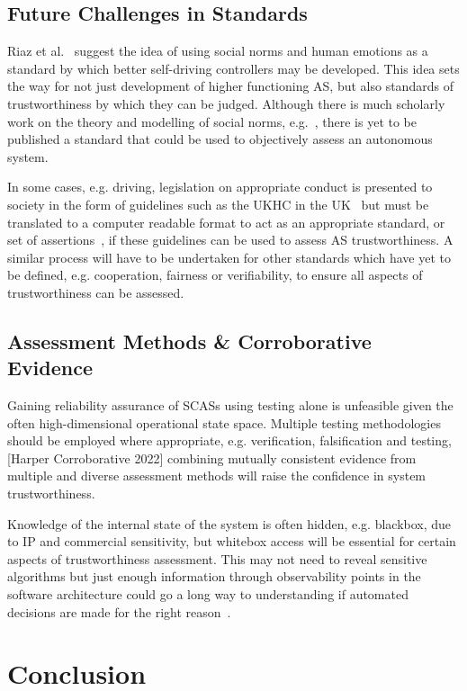 \subsection{Future Challenges in Standards} \label{sec:AssFramVis-fut}

Riaz et al.~\cite{Riaz2018} suggest the idea of using social norms and human emotions as a standard by which better self-driving controllers may be developed. This idea sets the way for not just development of higher functioning AS, but also standards of trustworthiness by which they can be judged. Although there is much scholarly work on the theory and modelling of social norms, e.g.~\cite{hechter2001social}, there is yet to be published a standard that could be used to objectively assess an autonomous system. 

In some cases, e.g. driving, legislation on appropriate conduct is presented to society in the form of guidelines such as the UKHC in the UK~\cite{highwayCode} but must be translated to a computer readable format to act as an appropriate standard, or set of assertions~\cite{harper2021safety}, if these guidelines can be used to assess AS trustworthiness. A similar process will have to be undertaken for other standards which have yet to be defined, e.g. cooperation, fairness or verifiability, to ensure all aspects of trustworthiness can be assessed. 



\subsection{Assessment Methods \& Corroborative Evidence} \label{sec:AssFramVis-AssMthds}
Gaining reliability assurance of SCASs using testing alone is unfeasible given the often high-dimensional operational state space. Multiple testing methodologies should be employed where appropriate, e.g. verification, falsification and testing, [Harper Corroborative 2022] combining mutually consistent evidence from multiple and diverse assessment methods will raise the confidence in system trustworthiness.

Knowledge of the internal state of the system is often hidden, e.g. blackbox, due to IP and commercial sensitivity, but whitebox access will be essential for certain aspects of trustworthiness assessment. This may not need to reveal sensitive algorithms but just enough information through observability points in the software architecture could go a long way to understanding if automated decisions are made for the right reason~\cite{koopman2018toward}. 




\section{Conclusion} \label{sec:conc}
